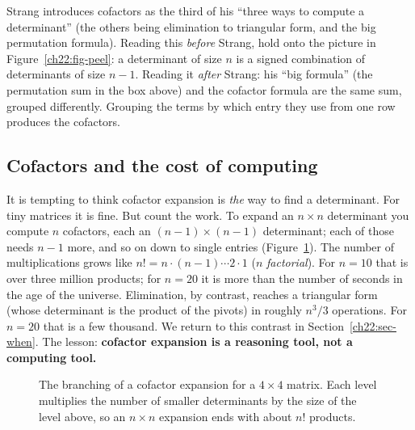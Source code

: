 \begin{strangbox}
Strang introduces cofactors as the third of his ``three ways to compute a determinant'' (the others
being elimination to triangular form, and the big permutation formula). Reading this \emph{before}
Strang, hold onto the picture in Figure~\ref{ch22:fig-peel}: a determinant of size $n$ is a
signed combination of determinants of size $n-1$. Reading it \emph{after} Strang: his
``big formula'' (the permutation sum in the box above) and the cofactor formula are the same sum,
grouped differently. Grouping the terms by which entry they use from one row produces the cofactors.
\end{strangbox}

\subsection{Cofactors and the cost of computing}

It is tempting to think cofactor expansion is \emph{the} way to find a determinant. For tiny matrices
it is fine. But count the work. To expand an $n\times n$ determinant you compute $n$ cofactors, each
an $(n-1)\times(n-1)$ determinant; each of those needs $n-1$ more, and so on down to single entries
(Figure~\ref{ch22:fig-tree}). The number of multiplications grows like
$n!=n\cdot(n-1)\cdots2\cdot1$ ($n$ \emph{factorial}). For $n=10$ that is over three million products; for
$n=20$ it is more than the number of seconds in the age of the universe. Elimination, by contrast,
reaches a triangular form (whose determinant is the product of the pivots) in roughly $n^3/3$
operations. For $n=20$ that is a few thousand. We return to this contrast in
Section~\ref{ch22:sec-when}. The lesson: \textbf{cofactor expansion is a reasoning tool,
not a computing tool.}

\begin{figure}[htbp]
\centering
{}
\caption{The branching of a cofactor expansion for a $4\times4$ matrix. Each level multiplies the
number of smaller determinants by the size of the level above, so an $n\times n$ expansion ends with
about $n!$ products.}
\label{ch22:fig-tree}
\end{figure}

